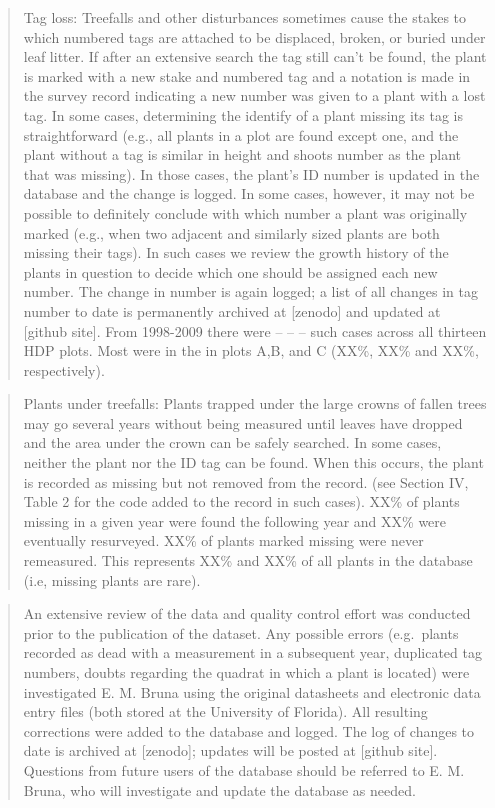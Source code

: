 \documentclass[
  english,
  man]{apa6}
\begin{document}
\begin{quote}
Tag loss: Treefalls and other disturbances sometimes cause the stakes
to which numbered tags are attached to be displaced, broken, or buried
under leaf litter. If after an extensive search the tag still can't be
found, the plant is marked with a new stake and numbered tag and a
notation is made in the survey record indicating a new number was
given to a plant with a lost tag. In some cases, determining the
identify of a plant missing its tag is straightforward (e.g., all
plants in a plot are found except one, and the plant without a tag is
similar in height and shoots number as the plant that was missing). In
those cases, the plant's ID number is updated in the database and the
change is logged. In some cases, however, it may not be possible to
definitely conclude with which number a plant was originally marked
(e.g., when two adjacent and similarly sized plants are both missing
their tags). In such cases we review the growth history of the plants
in question to decide which one should be assigned each new number.
The change in number is again logged; a list of all changes in tag
number to date is permanently archived at {[}zenodo{]} and updated at
{[}github site{]}. From 1998-2009 there were -- -- -- such cases across
all thirteen HDP plots. Most were in the in plots A,B, and C (XX\%, XX\%
and XX\%, respectively).
\end{quote}

\begin{quote}
Plants under treefalls: Plants trapped under the large crowns of
fallen trees may go several years without being measured until leaves
have dropped and the area under the crown can be safely searched. In
some cases, neither the plant nor the ID tag can be found. When this
occurs, the plant is recorded as missing but not removed from the
record. (see Section IV, Table 2 for the code added to the record in
such cases). XX\% of plants missing in a given year were found the
following year and XX\% were eventually resurveyed. XX\% of plants
marked missing were never remeasured. This represents XX\% and XX\% of
all plants in the database (i.e, missing plants are rare).
\end{quote}

\begin{quote}
An extensive review of the data and quality control effort was
conducted prior to the publication of the dataset. Any possible errors
(e.g.~plants recorded as dead with a measurement in a subsequent year,
duplicated tag numbers, doubts regarding the quadrat in which a plant
is located) were investigated E. M. Bruna using the original
datasheets and electronic data entry files (both stored at the
University of Florida). All resulting corrections were added to the
database and logged. The log of changes to date is archived at
{[}zenodo{]}; updates will be posted at {[}github site{]}. Questions from
future users of the database should be referred to E. M. Bruna, who
will investigate and update the database as needed.
\end{quote}
\end{document}
